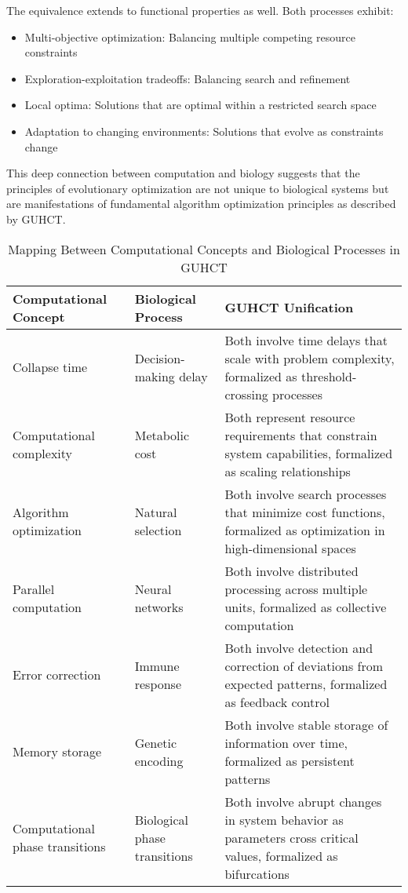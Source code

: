 \documentclass[11pt,a4paper]{article}
\makeatletter
\renewenvironment{proof}[1][\proofname]{\par
  \pushQED{\qed}%
  \normalfont \topsep6\p@\@plus6\p@\relax
  \trivlist
  \item[\hskip\labelsep
        \itshape
    #1\@addpunct{.}]\ignorespaces
}{%
  \popQED\endtrivlist\@endpefalse
}
\makeatother
\begin{document}
\begin{proof}
The equivalence extends to functional properties as well. Both processes exhibit:
\begin{itemize}
    \item Multi-objective optimization: Balancing multiple competing resource constraints
    \item Exploration-exploitation tradeoffs: Balancing search and refinement
    \item Local optima: Solutions that are optimal within a restricted search space
    \item Adaptation to changing environments: Solutions that evolve as constraints change
\end{itemize}

This deep connection between computation and biology suggests that the principles of evolutionary optimization are not unique to biological systems but are manifestations of fundamental algorithm optimization principles as described by GUHCT.
\end{proof}

\begin{table}[h!]
\centering
\caption{Mapping Between Computational Concepts and Biological Processes in GUHCT}
\label{tab:computation_biology_mapping}
\begin{tabular}{|p{3cm}|p{3cm}|p{8cm}|}
\hline
\textbf{Computational Concept} & \textbf{Biological Process} & \textbf{GUHCT Unification} \\
\hline
Collapse time & Decision-making delay & Both involve time delays that scale with problem complexity, formalized as threshold-crossing processes \\
\hline
Computational complexity & Metabolic cost & Both represent resource requirements that constrain system capabilities, formalized as scaling relationships \\
\hline
Algorithm optimization & Natural selection & Both involve search processes that minimize cost functions, formalized as optimization in high-dimensional spaces \\
\hline
Parallel computation & Neural networks & Both involve distributed processing across multiple units, formalized as collective computation \\
\hline
Error correction & Immune response & Both involve detection and correction of deviations from expected patterns, formalized as feedback control \\
\hline
Memory storage & Genetic encoding & Both involve stable storage of information over time, formalized as persistent patterns \\
\hline
Computational phase transitions & Biological phase transitions & Both involve abrupt changes in system behavior as parameters cross critical values, formalized as bifurcations \\
\hline
\end{tabular}
\end{table}
\end{document}
